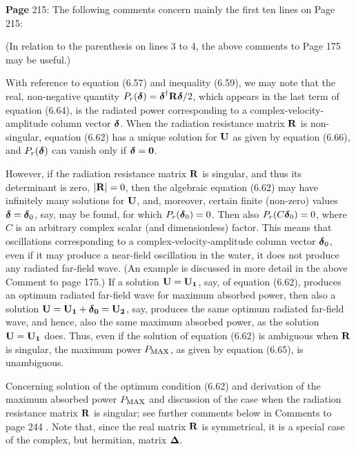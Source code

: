 \documentclass[a4paper,12pt]{article}
\newcommand{\bdelta}{\mbox{\boldmath ${\rm \delta}$}}
\begin{document}
\noindent %
{\bf Page} 215: The following comments concern mainly the first ten lines on Page 215:
\vspace{0.2cm}

\noindent
(In relation to the parenthesis on lines 3 to 4, the above comments to \linebreak 
Page 175 may be useful.)
\vspace{0.2cm}

\noindent
With reference to equation (6.57) and inequality (6.59), we may note that the real, non-negative quantity $P_{r}(\bdelta) = \bdelta^{\dagger} {\bf R}{\bdelta}/2$, which appears in the last term of equation (6.64), is the radiated power corresponding to a complex-velocity-amplitude column vector $\bdelta$. When the radiation resistance matrix $\bf R$ is non-singular, equation (6.62) has a unique solution for $\bf U$ as given by equation (6.66), and $P_{r}(\bdelta)$ can vanish only if $\bdelta = \bf 0$.

However, if the radiation resistance matrix $\bf R$ is singular, and thus its determinant is zero, $|{\bf R}| = 0$, then the algebraic equation (6.62) may have infinitely many solutions for $\bf U$, and, moreover, certain finite (non-zero) values $\bdelta = \bdelta_0$, say, may be found, for which $P_{r}(\bdelta_0) = 0$. Then also $P_{r}(C \bdelta_0) = 0$, where $C$ is an arbitrary complex scalar (and dimensionless) factor. This means that oscillations corresponding to a complex-velocity-amplitude column vector $\bdelta_0$, even if it may produce a near-field oscillation in the water, it does not produce any radiated far-field wave. (An example is discussed in more detail in the above Comment to page 175.) If a solution $\bf U = \bf U_1$, say, of equation (6.62), produces an optimum radiated far-field wave for maximum absorbed power, then also a solution $\bf U = \bf U_1 + \bdelta_0 = \bf U_2$, say, produces the same optimum radiated far-field wave, and hence, also the same maximum absorbed power, as the solution $\bf U = \bf U_1$ does. Thus, even if the solution of equation (6.62) is ambiguous when $\bf R$ is singular, the maximum power $P_{\rm MAX}$, as given by equation (6.65), is unambiguous.

\vspace{0.3cm} %
\noindent %
Concerning solution of the optimum condition (6.62) and derivation of the maximum absorbed power $P_{\rm MAX}$ and discussion of the case when the radiation resistance matrix ${\bf R}$ is singular; see further comments below in Comments to page 244%
. Note that, since the real matrix ${\bf R}$ is symmetrical, it is a special case of the complex, but hermitian, matrix ${\bf \Delta}$.
\end{document}
